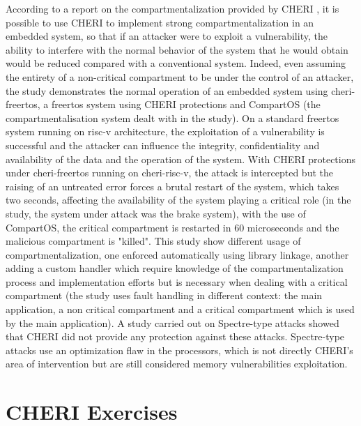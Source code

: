 \documentclass[a4paper, 11pt]{article}
\begin{document}
According to a report on the compartmentalization provided by CHERI \cite{almatary2022compartos}, it is possible to use CHERI to implement strong compartmentalization in an embedded system, so that if an attacker were to exploit a vulnerability, the ability to interfere with the normal behavior of the system that he would obtain would be reduced compared with a conventional system. Indeed, even assuming the entirety of a non-critical compartment to be under the control of an attacker, the study demonstrates the normal operation of an embedded system using \Gls{cheri-freertos}, a \Gls{freertos} system using CHERI protections and CompartOS (the compartmentalisation system dealt with in the study). On a standard \Gls{freertos} system running on \Gls{risc-v} architecture, the exploitation of a vulnerability is successful and the attacker can influence the integrity, confidentiality and availability of the data and the operation of the system. With CHERI protections under \Gls{cheri-freertos} running on \Gls{cheri-risc-v}, the attack is intercepted but the raising of an untreated error forces a brutal restart of the system, which takes two seconds, affecting the availability of the system playing a critical role (in the study, the system under attack was the brake system), with the use of CompartOS, the critical compartment is restarted in 60 microseconds and the malicious compartment is "killed". This study show different usage of compartmentalization, one enforced automatically using library linkage, another adding a custom handler which require knowledge of the compartmentalization process and implementation efforts but is necessary when dealing with a critical compartment (the study uses fault handling in different context: the main application, a non critical compartment and a critical compartment which is used by the main application).
A study carried out on Spectre-type attacks \cite{fuchs2021developing} showed that CHERI did not provide any protection against these attacks. Spectre-type attacks use an optimization flaw in the processors, which is not directly CHERI's area of intervention but are still considered memory vulnerabilities exploitation.
\clearpage
\section{CHERI Exercises}
\end{document}
